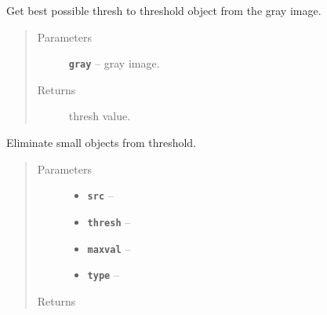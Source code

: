 \documentclass[letterpaper,10pt,english]{sphinxmanual}
\begin{document}

\begin{fulllineitems}
\label{RRtoolbox.lib.arrayops:RRtoolbox.lib.arrayops.mask.thresh_hist}
Get best possible thresh to threshold object from the gray image.
\begin{quote}\begin{description}
\item[{Parameters}] \leavevmode
\textbf{\texttt{gray}} -- gray image.

\item[{Returns}] \leavevmode
thresh value.

\end{description}\end{quote}

\end{fulllineitems}


\begin{fulllineitems}
\label{RRtoolbox.lib.arrayops:RRtoolbox.lib.arrayops.mask.threshold_opening}
Eliminate small objects from threshold.
\begin{quote}\begin{description}
\item[{Parameters}] \leavevmode\begin{itemize}
\item {} 
\textbf{\texttt{src}} -- 

\item {} 
\textbf{\texttt{thresh}} -- 

\item {} 
\textbf{\texttt{maxval}} -- 

\item {} 
\textbf{\texttt{type}} -- 

\end{itemize}

\item[{Returns}] \leavevmode


\end{description}\end{quote}

\end{fulllineitems}
\end{document}
